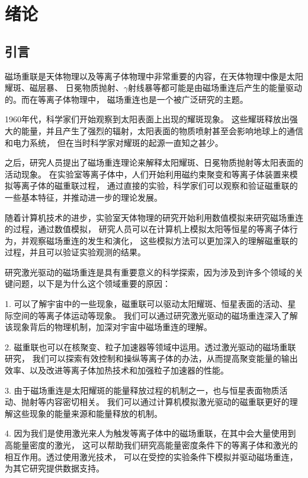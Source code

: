 \chapter{\textbf{绪论}}%
\section[\textnormal{引言}]{\textbf{引言}}

磁场重联是天体物理以及等离子体物理中非常重要的内容，在天体物理中像是太阳耀斑、磁层暴、
日冕物质抛射\cite{ANOKEUZOSIKE20244314}、$\gamma$射线暴等都可能是由磁场重连后产生的能量驱动的\cite{RevModPhys.82.603}。而在等离子体物理中，
磁场重连也是一个被广泛研究的主题。

1960年代，科学家们开始观察到太阳表面上出现的耀斑现象。
这些耀斑释放出强大的能量，并且产生了强烈的辐射，太阳表面的物质喷射甚至会影响地球上的通信和电力系统\cite{DEABREU20193586, ZHOU20244608}，
但在当时科学家对耀斑的起源一直知之甚少。

之后，研究人员提出了磁场重连理论\cite{RevModPhys.82.603, Cheng_2020}来解释太阳耀斑、日冕物质抛射等太阳表面的活动现象。
在实验室等离子体中，人们开始利用磁约束聚变和等离子体装置来模拟等离子体的磁重联过程，
通过直接的实验，科学家们可以观察和验证磁重联的一些基本特征，并推动进一步的理论发展。

随着计算机技术的进步，实验室天体物理的研究开始利用数值模拟来研究磁场重连的过程，通过数值模拟\cite{Lu_2021,Yi_2018}，
研究人员可以在计算机上模拟太阳等恒星的等离子体行为，并观察磁场重连的发生和演化，
这些模拟方法可以更加深入的理解磁重联的过程，并且可以验证实验观测的结果。

研究激光驱动的磁场重连是具有重要意义的科学探索，因为涉及到许多个领域的关键问题，以下是为什么这个领域重要的原因：

1. 可以了解宇宙中的一些现象，磁重联可以驱动太阳耀斑、恒星表面的活动、星际空间的等离子体运动\cite{RevModPhys.82.603}等现象。
我们可以通过研究激光驱动的磁场重连深入了解该现象背后的物理机制，加深对宇宙中磁场重连的理解。

2. 磁重联也可以在核聚变、粒子加速器\cite{Medina_Torrej_n_2023}等领域中运用。透过激光驱动的磁场重联研究，
我们可以探索有效控制和操纵等离子体的办法，从而提高聚变能量的输出效率、以及改进等离子体加热技术和加强粒子加速器的性能。

3. 由于磁场重连是太阳耀斑的能量释放过程的机制之一，也与恒星表面物质活动、抛射\cite{Lyubarsky_2001}等内容密切相关。
我们可以通过计算机模拟激光驱动的磁重联更好的理解这些现象的能量来源和能量释放的机制。

4. 因为我们是使用激光来人为触发等离子体中的磁场重联，在其中会大量使用到高能量密度的激光\cite{Takabe_Kuramitsu_2021, Yi_2018}，
这可以帮助我们研究高能量密度条件下的等离子体和激光的相互作用。透过使用激光技术，
可以在受控的实验条件下模拟并驱动磁场重连，为其它研究提供数据支持。


